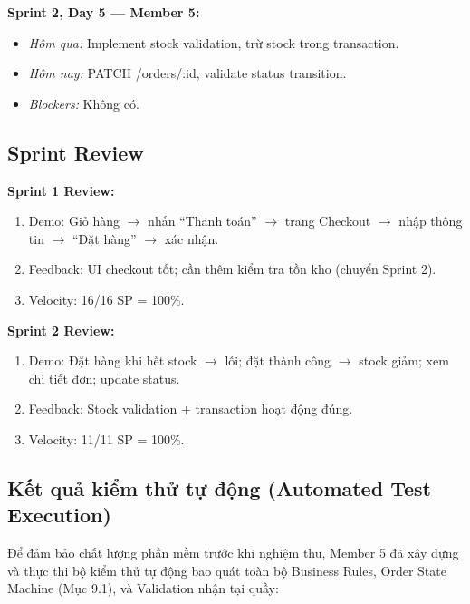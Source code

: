 \documentclass[12pt,a4paper]{article}
\begin{document}
\textbf{Sprint 2, Day 5 — Member 5:}
\begin{itemize}
  \item \textit{Hôm qua:} Implement stock validation, trừ stock trong transaction.
  \item \textit{Hôm nay:} PATCH /orders/:id, validate status transition.
  \item \textit{Blockers:} Không có.
\end{itemize}

\subsection{Sprint Review}

\textbf{Sprint 1 Review:}
\begin{enumerate}
  \item Demo: Giỏ hàng $\to$ nhấn ``Thanh toán'' $\to$ trang Checkout $\to$ nhập thông tin $\to$ ``Đặt hàng'' $\to$ xác nhận.
  \item Feedback: UI checkout tốt; cần thêm kiểm tra tồn kho (chuyển Sprint 2).
  \item Velocity: 16/16 SP = 100\%.
\end{enumerate}

\textbf{Sprint 2 Review:}
\begin{enumerate}
  \item Demo: Đặt hàng khi hết stock $\to$ lỗi; đặt thành công $\to$ stock giảm; xem chi tiết đơn; update status.
  \item Feedback: Stock validation + transaction hoạt động đúng.
  \item Velocity: 11/11 SP = 100\%.
\end{enumerate}

\subsection{Kết quả kiểm thử tự động (Automated Test Execution)}

Để đảm bảo chất lượng phần mềm trước khi nghiệm thu, Member 5 đã xây dựng và thực thi bộ kiểm thử tự động bao quát toàn bộ Business Rules, Order State Machine (Mục 9.1), và Validation nhận tại quầy:
\end{document}
